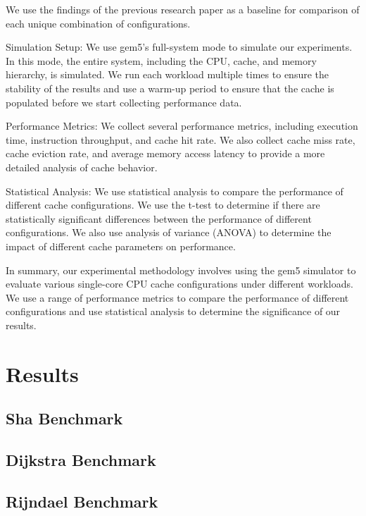 \documentclass[conference]{IEEEtran}
\begin{document}
We use the findings of the previous research paper as a baseline for comparison of each unique combination of configurations.

Simulation Setup:
We use gem5's full-system mode to simulate our experiments. In this mode, the entire system, including the CPU, cache, and memory hierarchy, is simulated. We run each workload multiple times to ensure the stability of the results and use a warm-up period to ensure that the cache is populated before we start collecting performance data.

Performance Metrics:
We collect several performance metrics, including execution time, instruction throughput, and cache hit rate. We also collect cache miss rate, cache eviction rate, and average memory access latency to provide a more detailed analysis of cache behavior.

Statistical Analysis:
We use statistical analysis to compare the performance of different cache configurations. We use the t-test to determine if there are statistically significant differences between the performance of different configurations. We also use analysis of variance (ANOVA) to determine the impact of different cache parameters on performance.

In summary, our experimental methodology involves using the gem5 simulator to evaluate various single-core CPU cache configurations under different workloads. We use a range of performance metrics to compare the performance of different configurations and use statistical analysis to determine the significance of our results.

\section{Results}


\subsection{Sha Benchmark}


\subsection{Dijkstra Benchmark}


\subsection{Rijndael Benchmark}
\end{document}
